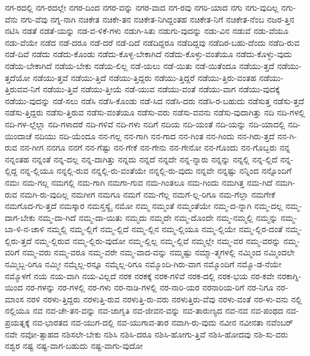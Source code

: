 {ನಗ-ರದಲ್ಲಿ
ನಗ-ರದಲ್ಲೇ
ನಗರ-ದಿಂದ
ನಗರ-ವನ್ನು
ನಗರ-ವಾದ
ನಗ-ರವು
ನಗರಿ-ಯಾದ
ನಗು
ನಗು-ವುದಿಲ್ಲ
ನಗು-ವೆನು
ನಗು-ವೆವು
ನಗ್ನ-ನಾಗಿ
ನಚಿಕೇತ
ನಚಿಕೇ-ತನ
ನಚಿಕೇತ-ನಿಗಿದ್ದಂತಹ
ನಚಿಕೇತ-ನಿಗೆ
ನಚಿಕೇತ-ನೆಂಬ
ನಜರ-ತ್ತಿನ
ನಟಿಸಿ
ನಡತೆ
ನಡತೆ-ಯನ್ನು
ನಡ-ವ-ಳಿಕೆ-ಗಳು
ನಡುಗಿ-ಸಿತು
ನಡುಗು-ವುದನ್ನು
ನಡು-ವಿನ
ನಡುವೆ
ನಡು-ವೆಯೂ
ನಡು-ವೆಯೇ
ನಡೆದ
ನಡೆ-ದರೂ
ನಡೆ-ದರೆ
ನಡೆ-ದಿದೆ
ನಡೆದಿದ್ದರೂ
ನಡೆದಿದ್ದವು
ನಡೆದಿರ-ಬಹು-ದೆಂದು
ನಡೆದಿ-ರುವ
ನಡೆ-ದಿವೆ
ನಡೆದು
ನಡೆದು-ಕೊಂಡು
ನಡೆದು-ಕೊಳ್ಳ-ಬೇಕಾಗಿದೆ
ನಡೆದು-ಕೊಳ್ಳು-ವಂತೆಯೂ
ನಡೆದು-ಕೊಳ್ಳು-ವುದು
ನಡೆಯ-ಬೇಕಾಗಿದೆ
ನಡೆಯ-ಬೇಕು
ನಡೆಯ-ಲಿಲ್ಲ
ನಡೆ-ಯಲು
ನಡೆ-ಯಿತು
ನಡೆ-ಯಿತೆಂದೂ
ನಡೆಯು-ತ್ತದೆ
ನಡೆಯು-ತ್ತದೆಯೋ
ನಡೆಯು-ತ್ತವೆ
ನಡೆಯು-ತ್ತಿದೆ
ನಡೆಯು-ತ್ತಿದ್ದರು
ನಡೆಯು-ತ್ತಿದ್ದರೆ
ನಡೆಯು-ತ್ತಿರು-ವಂತಹ
ನಡೆಯು-ತ್ತಿರುವವ-ನಿಗೆ
ನಡೆಯು-ತ್ತಿವೆ
ನಡೆಯು-ತ್ತೀಯೆ
ನಡೆ-ಯುವ
ನಡೆಯು-ವಂತೆ
ನಡೆಯು-ವಾಗ
ನಡೆಯು-ವುದಕ್ಕೆ
ನಡೆಯು-ವುದನ್ನು
ನಡೆ-ಸಲು
ನಡೆಸಿ
ನಡೆಸಿ-ಕೊಂಡು
ನಡೆ-ಸಿದ
ನಡೆಸಿ-ದರು
ನಡೆಸಿ-ರ-ಬಹುದು
ನಡೆಸುತ್ತ
ನಡೆಸು-ತ್ತದೆ
ನಡೆಸು-ತ್ತಿದ್ದರು
ನಡೆಸು-ತ್ತಿರುವ
ನಡೆಸು-ವಂತೆಯೂ
ನಡೆಸು-ವರು
ನಡೆಸು-ವವನು
ನಡೆಸು-ವುದಾಗಿತ್ತು
ನದಿ
ನದಿ-ಗಳಲ್ಲಿ
ನದಿ-ಗಳ-ಲ್ಲೆಲ್ಲಾ
ನದಿ-ಗಳಾದರೆ
ನದಿ-ಗಳಿವೆ
ನದಿ-ಗಳು
ನದಿಗೆ
ನದಿಯ
ನದಿ-ಯಂತೆ
ನದಿ-ಯನ್ನು
ನದಿ-ಯಾದಲ್ಲಿ
ನದಿ-ಯಿಂದಾಚೆ
ನದಿಯು
ನದಿ-ಯೆಂದೂ
ನನ-ಗಲ್ಲ
ನನ-ಗಾಗಿ
ನನ-ಗಾದ
ನನ-ಗಿಂತ
ನನ-ಗಿಂದು
ನನ-ಗಿರು-ತ್ತದೆ
ನನ-ಗಿ-ರುವ
ನನ-ಗೀಗ
ನನಗೂ
ನನಗೆ
ನನ-ಗೆಷ್ಟು
ನನ-ಗೇಕೆ
ನನ-ಗೇನು
ನನ-ಗೇನೋ
ನನ-ಗೊಂದು
ನನ-ಗೊಬ್ಬರು
ನನ್ನ
ನನ್ನಂತಹ
ನನ್ನಂತೆ
ನನ್ನ-ದಲ್ಲ
ನನ್ನ-ದಾಗಿತ್ತು
ನನ್ನದು
ನನ್ನದೆ
ನನ್ನದೇ
ನನ್ನ-ನ್ನಾರು
ನನ್ನನ್ನು
ನನ್ನಲ್ಲಿ
ನನ್ನ-ಲ್ಲಿದೆ
ನನ್ನ-ಲ್ಲಿದ್ದ
ನನ್ನ-ಲ್ಲಿಯೂ
ನನ್ನಲ್ಲಿ-ರುವ
ನನ್ನಲ್ಲಿ-ರು-ವಂತೆಯೇ
ನನ್ನಲ್ಲಿ-ರು-ವುದು
ನನ್ನವೇ
ನನ್ನಷ್ಟು
ನನ್ನಿಂದ
ನನ್ನೊಂದಿಗೆ
ನಮಃ
ನಮ-ಗಲ್ಲ
ನಮಗಲ್ಲಿ
ನಮ-ಗಾಗಿ
ನಮಗಾ-ಗುವ
ನಮ-ಗಿಂತಲೂ
ನಮ-ಗಿಂದು
ನಮಗಿತ್ತ
ನಮ-ಗಿದೆ
ನಮಗಿ-ರುವ
ನಮಗಿ-ರು-ವುದಿಲ್ಲ
ನಮಗೀಗ
ನಮಗೂ
ನಮಗೆ
ನಮ-ಗೆಲ್ಲ
ನಮಗೆ-ಲ್ಲ-ರಿಗೂ
ನಮ-ಗೆಲ್ಲಾ
ನಮಗೇಕೆ
ನಮಗೊದ-ಗು-ತ್ತದೆ
ನಮಸ್ಕಾರ
ನಮಸ್ತಸ್ಯೈ
ನಮೋ
ನಮ್ಮ
ನಮ್ಮಂತೆ
ನಮ್ಮಂತೆಯೇ
ನಮ್ಮ-ದ-ನ್ನಾಗಿ
ನಮ್ಮ-ದಲ್ಲ
ನಮ್ಮ-ದಾಗ-ಬೇಕು
ನಮ್ಮ-ದಾ-ಗಿದೆ
ನಮ್ಮ-ದಾ-ಯಿತು
ನಮ್ಮದು
ನಮ್ಮದೇ
ನಮ್ಮ-ದೊಂದೇ
ನಮ್ಮ-ನಮ್ಮಲ್ಲಿ
ನಮ್ಮನ್ನು
ನಮ್ಮ-ಬಾ-ಳಿ-ನ-ಚಾಳಿ
ನಮ್ಮಲ್ಲಿ
ನಮ್ಮ-ಲ್ಲಿಗೆ
ನಮ್ಮ-ಲ್ಲಿದೆ
ನಮ್ಮ-ಲ್ಲಿನ
ನಮ್ಮ-ಲ್ಲಿಯೂ
ನಮ್ಮ-ಲ್ಲಿಯೇ
ನಮ್ಮ-ಲ್ಲಿರ-ದಂತೆ
ನಮ್ಮ-ಲ್ಲಿರು-ತ್ತದೆ
ನಮ್ಮ-ಲ್ಲಿರುವ
ನಮ್ಮ-ಲ್ಲಿರು-ವುದೋ
ನಮ್ಮ-ಲ್ಲಿಲ್ಲ
ನಮ್ಮ-ಲ್ಲಿವೆ
ನಮ್ಮಲ್ಲೇ
ನಮ್ಮ-ವರ
ನಮ್ಮ-ವರನ್ನು
ನಮ್ಮ-ವರಿಗೆ
ನಮ್ಮ-ವರು
ನಮ್ಮ-ವರೂ
ನಮ್ಮ-ವರೇ
ನಮ್ಮ-ವಾದ-ವನ್ನು
ನಮ್ಮಷ್ಟು
ನಮ್ಮಾ-ತ್ಮಗಳಲ್ಲಿ
ನಮ್ಮಿಂದ
ನಮ್ಮಿಂದಲೇ
ನಮ್ಮಿಬ್ಬ-ರಿಗೂ
ನಮ್ಮೀ
ನಮ್ಮೆಲ್ಲ-ರನ್ನೂ
ನಮ್ಮೆಲ್ಲ-ರಿಗೂ
ನಮ್ಮೊಂದಿ-ಗಿರು-ವಾಗ
ನಮ್ಮೊಂದಿಗೆ
ನಮ್ಮೊ-ಡ-ನೆಯೇ
ನಮ್ಮೊಳಗೆ
ನಯ
ನಯ-ವಾಗಿ
ನಯ-ವಿಲ್ಲದೆ
ನರಕ
ನರಕಕ್ಕೆ
ನರಕ-ಗಳಿವೆ
ನರಕ-ದಲ್ಲಿ
ನರಕ-ಭಯ
ನರ-ಕವೇ
ನರಕಾಗ್ನಿ-ಯಿಂದ
ನರ-ಗಳನ್ನು
ನರ-ಗಳಲ್ಲಿ
ನರ-ಗಳು
ನರ-ನಾಡಿ-ಗಳಲ್ಲಿ
ನರ-ನಾರಿ-ಯರ
ನರನಾರಿಯ-ರಿಗೆ
ನರ-ನಿಗೂ
ನರ-ಮಾಂಸ
ನರಳಿ
ನರಳು-ತ್ತಿದ್ದರು
ನರಳುತ್ತಿ-ರುವ
ನರಳುತ್ತಿ-ರು-ವರು
ನರಳುತ್ತಿರು-ವೆವು
ನರಳು-ವಂತೆ
ನರ-ಳು-ವನು
ನಲ್ಲಿ
ನಲ್ಲಿಯೂ
ನವ
ನವ-ಚೇ-ತನ-ವನ್ನು
ನವ-ಜಾಗೃತಿ
ನವ-ಜೀವನ-ವನ್ನು
ನವ-ತಾರುಣ್ಯದ
ನವ-ನವ
ನವ-ಪಂಥದ
ನವ-ಪ್ರಯತ್ನಕ್ಕೆ
ನವ-ಭಾರತದ
ನವ-ಯುಗ-ದಲ್ಲಿ
ನವ-ಯುಗಾವ-ತಾರ
ನವಾಗಿ-ರು-ವುದು
ನವೀನ
ನವೀನತಾ
ನವೆಂಬರ್
ನವೇ
ನವೋ-ತ್ಸಾಹದ
ನಶಿಸಲೇ-ಬೇಕು
ನಶಿಸಿ
ನಶಿಸಿ-ದರೂ
ನಶಿಸಿ-ಹೋಗು-ತ್ತಿವೆ
ನಶಿಸಿ-ಹೋದವು
ನಶಿ-ಸು-ವರು
ನಶ್ವರ
ನಷ್ಟ
ನಷ್ಟ-ವಾಗ-ಬಹುದು
ನಷ್ಟ-ವಾಗು-ವುದೋ
}
